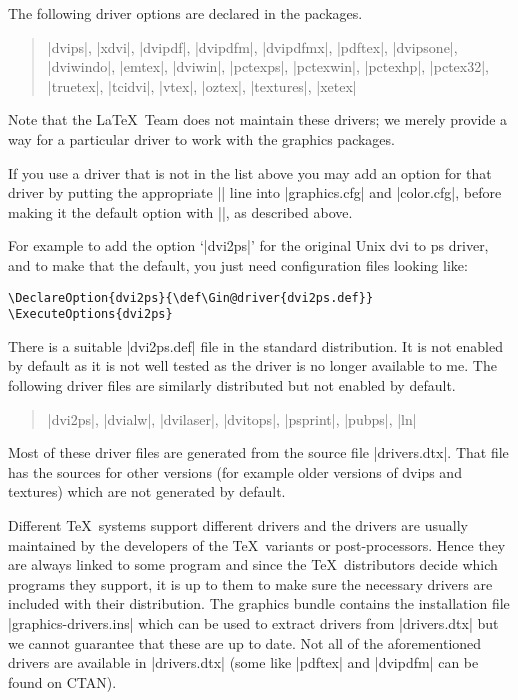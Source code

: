 The following driver options are declared in the packages.
\begin{quote}\raggedright
  |dvips|, |xdvi|, |dvipdf|, |dvipdfm|, |dvipdfmx|, |pdftex|,
  |dvipsone|, |dviwindo|, |emtex|, |dviwin|, |pctexps|, |pctexwin|,
  |pctexhp|, |pctex32|, |truetex|, |tcidvi|, |vtex|, |oztex|,
  |textures|, |xetex|
\end{quote}
Note that the \LaTeX\ Team does not maintain these drivers; we merely
provide a way for a particular driver to work with the graphics
packages.

If you use a driver that is not in the list above you may add an option
for that driver by putting the appropriate |\DeclareOption| line into
|graphics.cfg| and |color.cfg|, before making it the default option
with |\ExecuteOptions|, as described above.

For example to add the option `|dvi2ps|' for the original Unix dvi to
ps driver, and to make that the default, you just need configuration
files looking like:
\begin{verbatim}
\DeclareOption{dvi2ps}{\def\Gin@driver{dvi2ps.def}}
\ExecuteOptions{dvi2ps}
\end{verbatim}

There is a suitable |dvi2ps.def| file in the standard distribution.
It is not enabled by default as it is not well tested as the driver is
no longer available to me. The following driver files are similarly
distributed but not enabled by default.
\begin{quote}\raggedright
 |dvi2ps|, |dvialw|, |dvilaser|, |dvitops|, |psprint|, |pubps|, |ln|
\end{quote}

Most of these driver files are generated from the source file
|drivers.dtx|. That file has the sources for other versions (for
example older versions of dvips and textures) which are not generated
by default.

Different \TeX\ systems support different drivers and the drivers are
usually maintained by the developers of the \TeX\ variants or
post-processors. Hence they are always linked to some program and
since the \TeX\ distributors decide which programs they support, it is
up to them to make sure the necessary drivers are included with their
distribution. The graphics bundle contains the installation file
|graphics-drivers.ins| which can be used to extract drivers from
|drivers.dtx| but we cannot guarantee that these are up to date. Not
all of the aforementioned drivers are available in |drivers.dtx| (some
like |pdftex| and |dvipdfm| can be found on CTAN).

